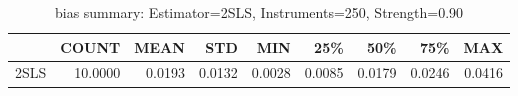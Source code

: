\begin{table}[ht]
\centering
\caption{bias summary: Estimator=2SLS, Instruments=250, Strength=0.90}
\begin{tabular}{lrrrrrrrr}
\toprule
 & COUNT & MEAN & STD & MIN & 25\% & 50\% & 75\% & MAX \\
\midrule
2SLS & 10.0000 & 0.0193 & 0.0132 & 0.0028 & 0.0085 & 0.0179 & 0.0246 & 0.0416 \\
\bottomrule
\end{tabular}
\end{table}
